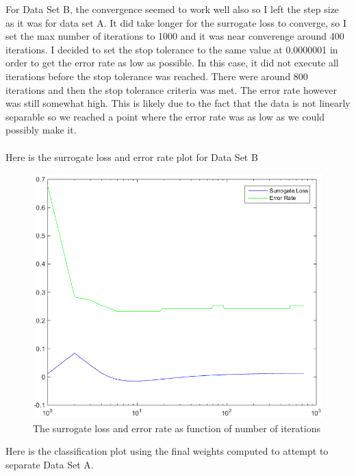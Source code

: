 \documentclass[twoside,11pt]{article}
\theoremstyle{definition}
\begin{document}
\newpage
For Data Set B, the convergence seemed to work well also so I left the step size as it was for data set A. It did take longer for the surrogate loss to converge, so I set the max number of iterations to 1000 and it was near converenge around 400 iterations. I decided to set the stop tolerance to the same value at 0.0000001 in order to get the error rate as low as possible. In this case, it did not execute all iterations before the stop tolerance was reached. There were around 800 iterations and then the stop tolerance criteria was met. The error rate however was still somewhat high. This is likely due to the fact that the data is not linearly separable so we reached a point where the error rate was as low as we could possibly make it. \\
\\
Here is the surrogate loss and error rate plot for Data Set B\\
\begin{figure}[h]
\centering
\includegraphics[width=5 in]{prob1fPlotB1.png}
\caption{The surrogate loss and error rate as function of number of iterations}
\end{figure}

\newpage

Here is the classification plot using the final weights computed to attempt to separate Data Set A.\\
\end{document}
